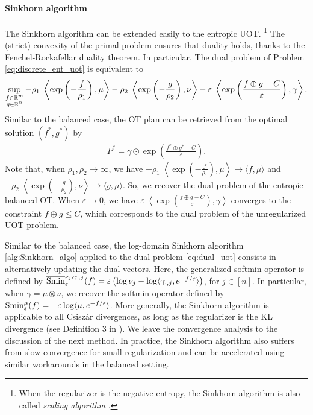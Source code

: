 \paragraph{Sinkhorn algorithm} The Sinkhorn algorithm can be extended easily to the entropic UOT.
\footnote{When the regularizer is the negative entropy, the Sinkhorn algorithm is also called
\textit{scaling algorithm} \citep{Chizat18a}.} The (strict) convexity of the primal problem ensures
that duality holds, thanks to the Fenchel-Rockafellar duality theorem. In particular,
The dual problem of Problem \eqref{eq:discrete_ent_uot} is equivalent to
\begin{align}
  \label{eq:dual_uot}
  \sup_{\substack{f \in \mathbb R^m \\ g \in \mathbb R^n}}
  -\rho_1 \; \left\langle \exp \left( - \frac{f}{\rho_1}\right), \mu \right\rangle
  -\rho_2 \; \left\langle \exp \left( - \frac{g}{\rho_2} \right), \nu \right\rangle
  - \varepsilon \; \left\langle \exp
  \left( \frac{f \oplus g - C}{\varepsilon} \right), \gamma \right\rangle.
\end{align}
Similar to the balanced case, the OT plan can be retrieved from the optimal solution $(f^*, g^*)$ by
\begin{align}
  P^* = \gamma \odot \exp \left( \frac{f^* \oplus g^* - C}{\varepsilon} \right).
\end{align}
Note that, when $\rho_1, \rho_2 \to \infty$, we have
$-\rho_1 \; \left\langle \exp \left( - \frac{f}{\rho_1}\right), \mu \right\rangle \to
\langle f, \mu \rangle$ and
$-\rho_2 \; \left\langle \exp \left( - \frac{g}{\rho_2} \right), \nu \right\rangle \to \langle g, \mu \rangle$.
So, we recover the dual problem of the entropic balanced OT.
When $\varepsilon \to 0$, we have
$\varepsilon \; \left\langle \exp \left( \frac{f \oplus g - C}{\varepsilon} \right), \gamma \right\rangle$
converges to the constraint $f \oplus g \leq C$, which corresponds to the dual problem of the
unregularized UOT problem.

Similar to the balanced case, the log-domain Sinkhorn algorithm \ref{alg:Sinkhorn_algo}
applied to the dual problem \eqref{eq:dual_uot} consists in alternatively updating the dual vectors.
Here, the generalized softmin operator is defined by
$\overline{\text{Smin}}^{\nu_j, \gamma_{\cdot, j}}_{\varepsilon}(f) =
\varepsilon \left( \log \nu_j - \log \langle \gamma_{\cdot, j}, e^{-f / \varepsilon} \rangle \right)$,
for $j \in [n]$. In particular, when $\gamma = \mu \otimes \nu$, we recover the softmin operator
\citep{Sejourne19} defined by
$\text{Smin}^{\mu}_{\varepsilon}(f) = -\varepsilon \log \langle \mu, e^{-f / \varepsilon} \rangle$.
More generally, the Sinkhorn algorithm is applicable to all Csiszár divergences,
as long as the regularizer is the KL divergence (see Definition 3 in \citep{Sejourne19}).
We leave the convergence analysis to the discussion of the next method.
In practice, the Sinkhorn algorithm also suffers from slow convergence for small regularization
and can be accelerated using similar workarounds in the balanced setting.

